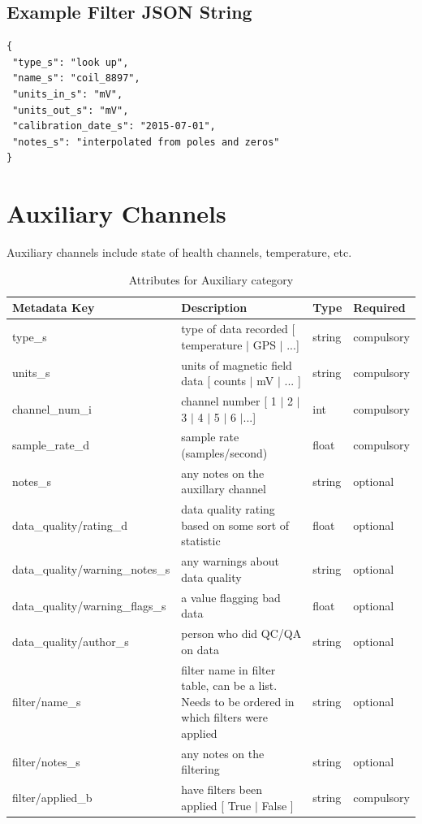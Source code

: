 \documentclass{article}
\begin{document}
\subsection{Example Filter JSON String} 

\begin{verbatim}
{
 "type_s": "look up",
 "name_s": "coil_8897",
 "units_in_s": "mV",
 "units_out_s": "mV",
 "calibration_date_s": "2015-07-01",
 "notes_s": "interpolated from poles and zeros"
}
\end{verbatim}

\newpage

\section{Auxiliary Channels}

Auxiliary channels include state of health channels, temperature, etc.  

\begin{table}[htb!]
	\caption[Attributes for Auxiliary Channel]{Attributes for Auxiliary category}
	\begin{tabular}{|l|p{3in}|l|l|}
		\hline
		\textbf{Metadata Key} & \textbf{Description} & \textbf{Type} & \textbf{Required} \\ \hline
		type\_s & type of data recorded [ temperature $|$ GPS $|$ ...] & string & compulsory \\ \hline
		units\_s & units of magnetic field data [ counts $|$ mV $|$ ... ] & string &  compulsory \\ \hline
		channel\_num\_i & channel number [ 1 $|$ 2 $|$ 3 $|$ 4 $|$ 5 $|$ 6 $|$...] & int &  compulsory \\ \hline
		sample\_rate\_d & sample rate (samples/second) & float &  compulsory \\ \hline
		notes\_s & any notes on the auxillary channel & string &  optional \\ \hline
		data\_quality/rating\_d & data quality rating based on some sort of statistic & float &  optional \\ \hline
		data\_quality/warning\_notes\_s & any warnings about data quality & string &   optional \\ \hline
		data\_quality/warning\_flags\_s & a value flagging bad data  & float &  optional \\ \hline
		data\_quality/author\_s & person who did QC/QA on data & string &   optional \\ \hline
		filter/name\_s & filter name in filter table, can be a list. Needs to be ordered in which filters were applied & string &  optional \\ \hline
		filter/notes\_s & any notes on the filtering & string &  optional \\ \hline
		filter/applied\_b & have filters been applied [ True $|$ False ] & string & compulsory \\ \hline
	\end{tabular}
	\label{tab:aux}
\end{table}
\end{document}
